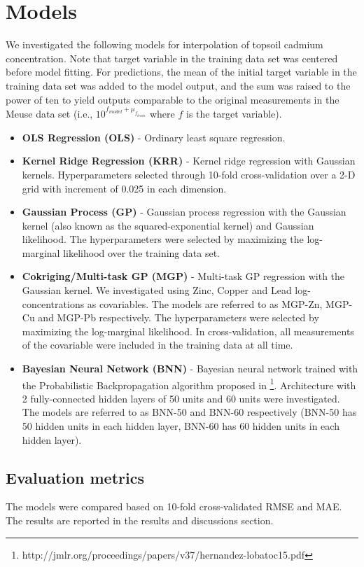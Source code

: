 \documentclass{article}
\begin{document}
\section{Models}
We investigated the following models for interpolation of topsoil cadmium concentration. 
Note that target variable in the training data set was centered before model fitting. For predictions, 
the mean of the initial target variable in the training data set was added to the model output, and the 
sum was raised to the power of ten to yield outputs comparable to the original measurements in the Meuse 
data set (i.e., $10^{f_{model} + \mu_{f_{train}}}$ where $f$ is the target variable).
\begin{itemize}
	\item \textbf{OLS Regression (OLS)} - Ordinary least square regression.
	\item \textbf{Kernel Ridge Regression (KRR)} - Kernel ridge regression with Gaussian kernels. 
		Hyperparameters selected through 10-fold cross-validation over a 2-D grid with 
		increment of 0.025 in each dimension.
	\item \textbf{Gaussian Process (GP)} - Gaussian process regression with the Gaussian kernel 
		(also known as the squared-exponential kernel) and Gaussian likelihood. The 
		hyperparameters were selected by maximizing the log-marginal likelihood over the 
		training data set.
	\item \textbf{Cokriging/Multi-task GP (MGP)} - Multi-task GP regression with the Gaussian kernel.
		We investigated using Zinc, Copper and Lead log-concentrations as covariables. The models 
		are referred to as MGP-Zn, MGP-Cu and MGP-Pb respectively. The hyperparameters were 
		selected by maximizing the log-marginal likelihood. In cross-validation, all measurements 
		of the covariable were included in the training data at all time.
	\item \textbf{Bayesian Neural Network (BNN)} - Bayesian neural network trained with the 
		Probabilistic Backpropagation algorithm proposed in 
		\footnote{http://jmlr.org/proceedings/papers/v37/hernandez-lobatoc15.pdf}. Architecture 
		with 2 fully-connected hidden layers of 50 units and 60 units were investigated. 
		The models are referred to as BNN-50 and BNN-60 respectively (BNN-50 has 50 hidden units  
		in each hidden layer, BNN-60 has 60 hidden units in each hidden layer).
\end{itemize}

\subsection{Evaluation metrics}
The models were compared based on 10-fold cross-validated RMSE and MAE. The results are reported in the 
results and discussions section.\\
\end{document}

